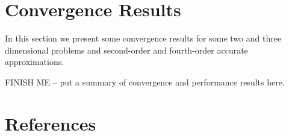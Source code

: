 \documentclass{article}
\begin{document}
\clearpage
\section{Convergence Results}\label{sec:convergenceResults}

In this section we present some convergence results for some
two and three dimensional problems and second-order and fourth-order
accurate approximations.



FINISH ME -- put a summary of convergence and performance results here.


\clearpage



\clearpage
\section{References}




% 



\printindex
\end{document}
